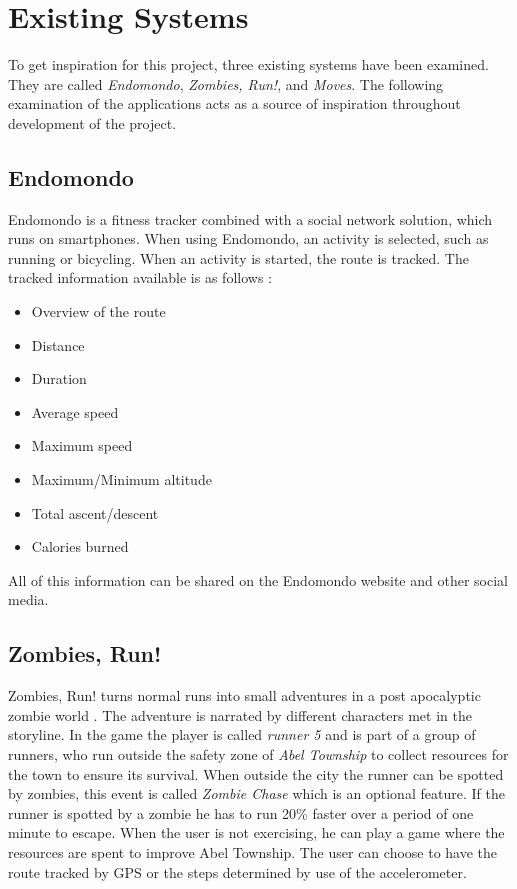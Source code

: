 \section{Existing Systems}\label{section:existing-systems}
To get inspiration for this project, three existing systems have been examined.
They are called \textit{Endomondo}, \textit{Zombies, Run!}, and \textit{Moves}.
The following examination of the applications acts as a source of inspiration throughout development of the project.

\subsection{Endomondo}
Endomondo is a fitness tracker combined with a social network solution, which runs on smartphones.
When using Endomondo, an activity is selected, such as running or bicycling. 
When an activity is started, the route is tracked.
The tracked information available is as follows \citep{misc:endomondo}:
\begin{itemize}
\item Overview of the route
\item Distance
\item Duration
\item Average speed
\item Maximum speed
\item Maximum/Minimum altitude
\item Total ascent/descent
\item Calories burned
\end{itemize}

All of this information can be shared on the Endomondo website and other social media.

\subsection{Zombies, Run!}
Zombies, Run! turns normal runs into small adventures in a post apocalyptic zombie world \citep{misc:zombiesrun}.
The adventure is narrated by different characters met in the storyline.
In the game the player is called \textit{runner 5} and is part of a group of runners, who run outside the safety zone of \textit{Abel Township} to collect resources for the town to ensure its survival.
When outside the city the runner can be spotted by zombies, this event is called \textit{Zombie Chase} which is an optional feature. 
If the runner is spotted by a zombie he has to run 20\% faster over a period of one minute to escape. 
When the user is not exercising, he can play a game where the resources are spent to improve Abel Township.
The user can choose to have the route tracked by GPS or the steps determined by use of the accelerometer.

